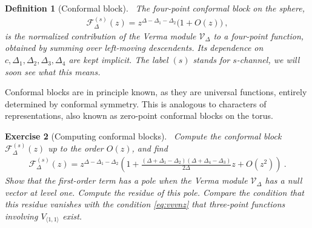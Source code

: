 \documentclass[12pt, a4paper]{article}
\theoremstyle{break}
\newtheorem{exo}{Exercise}[section]
\newtheorem{defn}[exo]{Definition}
\begin{document}
\begin{defn}[Conformal block]
 ~\label{def:block}
 The four-point conformal block on the sphere,
 \begin{align}
  \mathcal{F}^{(s)}_\Delta(z) = z^{\Delta-\Delta_1-\Delta_2}\Big( 1 + O(z) \Big)\ ,
  \label{eq:gsd}
 \end{align}
is the normalized contribution of the Verma module $\mathcal V_\Delta$ to a four-point function, obtained by summing over left-moving descendents. Its dependence on $c,\Delta_1,\Delta_2,\Delta_3,\Delta_4$ are kept implicit. The label $(s)$ stands for $s$-channel, we will soon see what this means.
\end{defn}
Conformal blocks are in principle known, as they are universal functions, entirely determined by conformal symmetry. This is analogous to characters of representations, also known as zero-point conformal blocks on the torus.

\begin{exo}[Computing conformal blocks]
 ~\label{exo:block}
 Compute the conformal block $ \mathcal{F}^{(s)}_\Delta(z)$ up to the order $O(z)$, and find
 \begin{align}
  \mathcal{F}^{(s)}_\Delta(z) = z^{\Delta-\Delta_1-\Delta_2}\left( 1 + \frac{(\Delta+\Delta_1-\Delta_2)(\Delta+\Delta_4-\Delta_3)}{2\Delta}z + O(z^2) \right)\ .
 \end{align}
 Show that the first-order term has a pole when the Verma module $\mathcal{V}_\Delta$ has a null vector at level one.
 Compute the residue of this pole. Compare the condition that this residue vanishes with the condition \eqref{eq:vvvnz} that three-point functions involving $V_{\langle 1,1\rangle}$ exist.
\end{exo}
\end{document}
